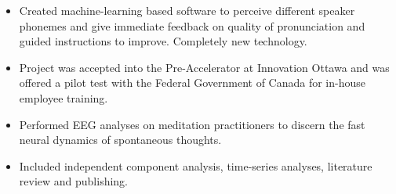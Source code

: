 \begin{itemize}
  \item Created machine-learning based software to perceive different speaker phonemes and give immediate feedback on quality of pronunciation and guided instructions to improve. Completely new technology.
  \item Project was accepted into the Pre-Accelerator at Innovation Ottawa and was offered a pilot test with the Federal Government of Canada for in-house employee training.
\end{itemize}
\divider\small

\begin{itemize}
  \item Performed EEG analyses on meditation practitioners to discern the fast neural dynamics of spontaneous thoughts.
  \item Included independent component analysis, time-series analyses, literature review and publishing.
\end{itemize}
\divider\small



